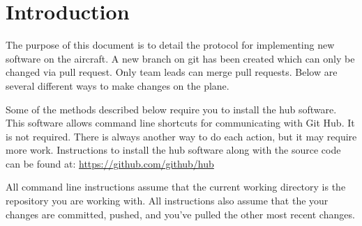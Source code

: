 \documentclass[]{auvsi_doc}
\begin{document}
\begin{AUVSITitlePage}
\begin{artifacttable}
\end{artifacttable}
\end{AUVSITitlePage}
\section{Introduction}

The purpose of this document is to detail the protocol for implementing new software on the aircraft. A new branch on git has been created which can only be changed via pull request. Only team leads can merge pull requests. Below are several different ways to make changes on the plane.

Some of the methods described below require you to install the hub software. This software allows command line shortcuts for communicating with Git Hub. It is not required. There is always another way to do each action, but it may require more work. Instructions to install the hub software along with the source code can be found at: \url{https://github.com/github/hub}  

All command line instructions assume that the current working directory is the repository you are working with. All instructions also assume that the your changes are committed, pushed, and you've pulled the other most recent changes.
\end{document}
